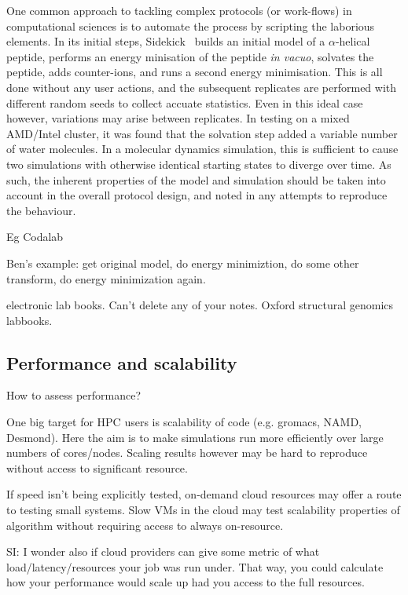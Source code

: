 \documentclass[conference]{IEEEtran}
\begin{document}
One common approach to tackling complex protocols (or work-flows) 
in computational sciences is to automate the process by scripting
the laborious elements. In its initial steps, Sidekick~\cite{Hall2014}
builds an initial model of a $\alpha$-helical peptide, performs an
energy minisation of the peptide \emph{in vacuo}, solvates the peptide,
adds counter-ions, and runs a second energy minimisation. This is all
done without any user actions, and the subsequent replicates are performed
with different random seeds to collect accuate statistics. Even in this 
ideal case however, variations may arise between replicates. In testing 
on a mixed AMD/Intel cluster, it was found that the solvation step added
a variable number of water molecules. In a molecular dynamics simulation, 
this is sufficient to cause two simulations with otherwise identical 
starting states to diverge over time. As such, the inherent properties
of the model and simulation should be taken into account in the overall
protocol design, and noted in any attempts to reproduce the behaviour.


Eg Codalab

Ben's example: get original model, do energy minimiztion, do some other transform, do energy minimization again. 

electronic lab books. Can't delete any of your notes. Oxford structural genomics labbooks. 

\subsection{Performance and scalability}


{How to assess performance?}

One big target for HPC users is scalability of code (e.g. gromacs,
NAMD, Desmond). Here the aim is to make simulations run more efficiently
over large numbers of cores/nodes. Scaling results however may be 
hard to reproduce without access to significant resource.

If speed isn't being explicitly tested, on-demand cloud resources 
may offer a route to testing small systems. Slow VMs in the cloud
may test scalability properties of algorithm without requiring access
to always on-resource.

SI: I wonder also if cloud providers can give some metric of what
load/latency/resources your job was run under.  That way, you could
calculate how your performance would scale up had you access to the
full resources. 
\end{document}
